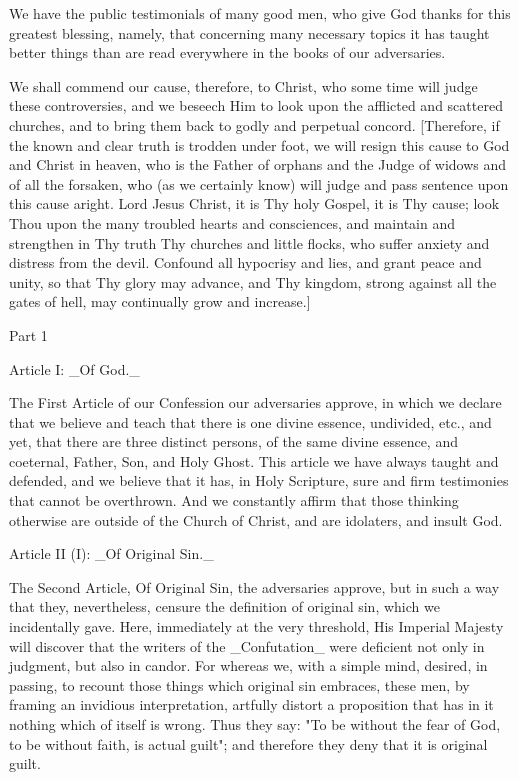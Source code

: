 We have the public testimonials of many good men, who give God thanks
for this greatest blessing, namely, that concerning many necessary
topics it has taught better things than are read everywhere in the
books of our adversaries.

We shall commend our cause, therefore, to Christ, who some time will
judge these controversies, and we beseech Him to look upon the
afflicted and scattered churches, and to bring them back to godly and
perpetual concord.  [Therefore, if the known and clear truth is
trodden under foot, we will resign this cause to God and Christ in
heaven, who is the Father of orphans and the Judge of widows and of
all the forsaken, who (as we certainly know) will judge and pass
sentence upon this cause aright.  Lord Jesus Christ, it is Thy holy
Gospel, it is Thy cause; look Thou upon the many troubled hearts and
consciences, and maintain and strengthen in Thy truth Thy churches
and little flocks, who suffer anxiety and distress from the devil.
Confound all hypocrisy and lies, and grant peace and unity, so that
Thy glory may advance, and Thy kingdom, strong against all the gates
of hell, may continually grow and increase.]




Part 1


Article I: _Of God._

The First Article of our Confession our adversaries approve, in which
we declare that we believe and teach that there is one divine essence,
undivided, etc., and yet, that there are three distinct persons, of
the same divine essence, and coeternal, Father, Son, and Holy Ghost.
This article we have always taught and defended, and we believe that
it has, in Holy Scripture, sure and firm testimonies that cannot be
overthrown.  And we constantly affirm that those thinking otherwise
are outside of the Church of Christ, and are idolaters, and insult
God.


Article II (I): _Of Original Sin._

The Second Article, Of Original Sin, the adversaries approve, but in
such a way that they, nevertheless, censure the definition of
original sin, which we incidentally gave.  Here, immediately at the
very threshold, His Imperial Majesty will discover that the writers
of the _Confutation_ were deficient not only in judgment, but also in
candor.  For whereas we, with a simple mind, desired, in passing, to
recount those things which original sin embraces, these men, by
framing an invidious interpretation, artfully distort a proposition
that has in it nothing which of itself is wrong.  Thus they say: "To
be without the fear of God, to be without faith, is actual guilt";
and therefore they deny that it is original guilt.


